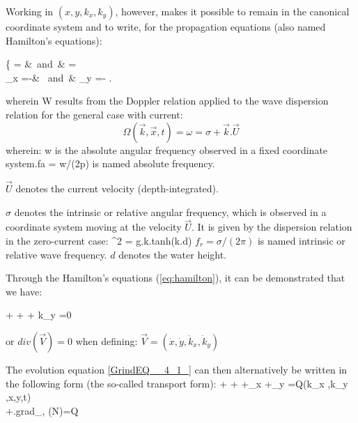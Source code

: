 Working in $(x, y, k_x, k_y)$, however, makes it possible to remain in the
canonical coordinate system and to write, for the propagation equations (also
named Hamilton's equations):

\bequ
\label{eq:hamilton}
\left\{
\dsp {}= &\mbox{ and }&\dsp {}
= \\[12pt]
\dsp {}_{x} =-& \mbox{ and }&\dsp
{}_{y} =-
\earr
\right.
\eequ  

wherein W results from the Doppler relation applied to the wave dispersion
relation for the general case with current:
\begin{equation} \label{GrindEQ__4_3_}
\Omega (\vec{k},\vec{x},t)=\omega =\sigma +\vec{k}.\vec{U}
\end{equation}
wherein:  w is the absolute angular frequency observed in a fixed coordinate
system.fa = w/(2p) is named absolute frequency.

 $\vec{U}$ denotes the current velocity (depth-integrated).

$\sigma$ denotes the intrinsic or relative angular frequency, which is
observed in a coordinate system moving at the velocity $\vec{U}$. It is given
by the dispersion relation in the zero-current case:
\bequ
\label{eq:reldispersion}    
\sigma^2 = g.k.tanh(k.d) 
\eequ
$ f_r = \sigma/(2\pi)$ is named intrinsic or relative wave frequency. $d$
denotes the water height.

Through the Hamilton's equations (\ref{eq:hamilton}), it can be demonstrated
that we have:

\bequ 
\label{eq:equ4.5.a}
 + +
 +
     {\partial k_{y} } =0
\eequ

or  $div(\vec{V}) = 0$   when defining: $\vec{V}=(\dot{x},\dot{y},\dot{k}_{x} ,
\dot{k}_{y} )$

The evolution equation \eqref{GrindEQ__4_1_} can then alternatively be written
in the following form (the so-called transport form):
\bequ
\label{eq:transform}
\dsp
{} + +
 +_x 
+_y  =Q(k_x ,k_y ,x,y,t)\\[6pt]
\dsp
{} +.grad_{,} (N)=Q
\earr 
\eequ

